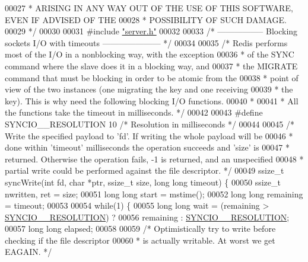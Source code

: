 \begin{DoxyCode}
00027 \textcolor{comment}{ * ARISING IN ANY WAY OUT OF THE USE OF THIS SOFTWARE, EVEN IF ADVISED OF THE}
00028 \textcolor{comment}{ * POSSIBILITY OF SUCH DAMAGE.}
00029 \textcolor{comment}{ */}
00030 
00031 \textcolor{preprocessor}{#}\textcolor{preprocessor}{include} \hyperlink{server_8h}{"server.h"}
00032 
00033 \textcolor{comment}{/* ----------------- Blocking sockets I/O with timeouts --------------------- */}
00034 
00035 \textcolor{comment}{/* Redis performs most of the I/O in a nonblocking way, with the exception}
00036 \textcolor{comment}{ * of the SYNC command where the slave does it in a blocking way, and}
00037 \textcolor{comment}{ * the MIGRATE command that must be blocking in order to be atomic from the}
00038 \textcolor{comment}{ * point of view of the two instances (one migrating the key and one receiving}
00039 \textcolor{comment}{ * the key). This is why need the following blocking I/O functions.}
00040 \textcolor{comment}{ *}
00041 \textcolor{comment}{ * All the functions take the timeout in milliseconds. */}
00042 
00043 \textcolor{preprocessor}{#}\textcolor{preprocessor}{define} \textcolor{preprocessor}{SYNCIO\_\_RESOLUTION} 10 \textcolor{comment}{/* Resolution in milliseconds */}
00044 
00045 \textcolor{comment}{/* Write the specified payload to 'fd'. If writing the whole payload will be}
00046 \textcolor{comment}{ * done within 'timeout' milliseconds the operation succeeds and 'size' is}
00047 \textcolor{comment}{ * returned. Otherwise the operation fails, -1 is returned, and an unspecified}
00048 \textcolor{comment}{ * partial write could be performed against the file descriptor. */}
00049 ssize\_t syncWrite(\textcolor{keywordtype}{int} fd, \textcolor{keywordtype}{char} *ptr, ssize\_t size, \textcolor{keywordtype}{long} \textcolor{keywordtype}{long} timeout) \{
00050     ssize\_t nwritten, ret = size;
00051     \textcolor{keywordtype}{long} \textcolor{keywordtype}{long} start = mstime();
00052     \textcolor{keywordtype}{long} \textcolor{keywordtype}{long} remaining = timeout;
00053 
00054     \textcolor{keywordflow}{while}(1) \{
00055         \textcolor{keywordtype}{long} \textcolor{keywordtype}{long} wait = (remaining > \hyperlink{syncio_8c_abba2f131af11e3cf265355831c9bcbb2}{SYNCIO\_\_RESOLUTION}) ?
00056                           remaining : \hyperlink{syncio_8c_abba2f131af11e3cf265355831c9bcbb2}{SYNCIO\_\_RESOLUTION};
00057         \textcolor{keywordtype}{long} \textcolor{keywordtype}{long} elapsed;
00058 
00059         \textcolor{comment}{/* Optimistically try to write before checking if the file descriptor}
00060 \textcolor{comment}{         * is actually writable. At worst we get EAGAIN. */}

\end{DoxyCode}
